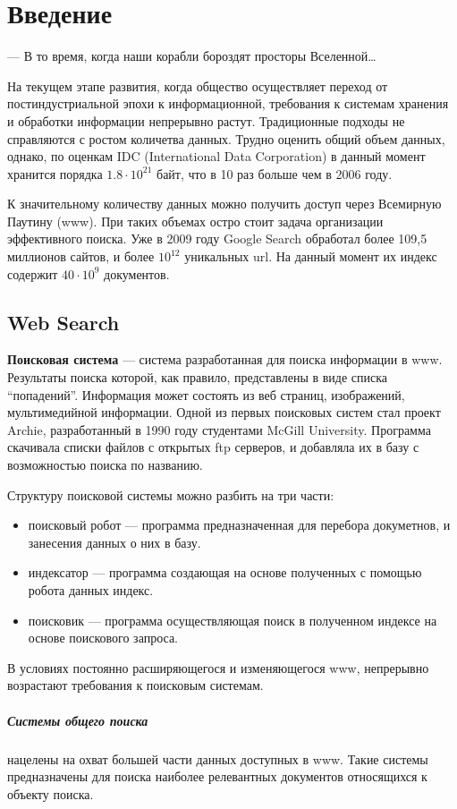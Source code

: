 \chapter{Введение} 
\epigraph{— В то время, когда наши корабли бороздят просторы
Вселенной…}{} На текущем этапе развития, когда общество осуществляет переход от
постиндустриальной эпохи к информационной, требования к системам хранения и
обработки информации непрерывно растут. Традиционные подходы не справляются с
ростом количетва данных. Трудно оценить общий объем данных, однако, по оценкам
IDC (International Data Corporation) в данный момент хранится порядка
$1.8\cdot10^{21}$ байт, что в 10 раз больше чем в 2006 году.

К значительному количеству данных можно получить доступ через Всемирную Паутину
(www). При таких объемах остро стоит задача организации эффективного поиска. Уже
в 2009 году Google Search обработал более 109,5 миллионов сайтов, и более
$10^{12}$ уникальных url. На данный момент их индекс содержит $40\cdot10^{9}$
документов.

\section{Web Search} 
\textbf{Поисковая система} --- система разработанная для
поиска информации в www. Результаты поиска которой, как правило, представлены в
виде списка ``попадений''. Информация может состоять из веб страниц,  изображений,
мультимедийной информации. Одной из первых поисковых систем стал
проект Archie, разработанный в 1990 году студентами McGill University. Программа скачивала
списки файлов с открытых ftp серверов, и добавляла их в базу с возможностью
поиска по названию. %

Структуру поисковой системы можно разбить на три части: \begin{itemize} \item
поисковый робот --- программа предназначенная для перебора докуметнов, и
занесения данных о них в базу. \item индексатор --- программа создающая на
основе полученных с помощью робота данных индекс. \item поисковик --- программа
осуществляющая поиск в полученном индексе на основе поискового запроса.
\end{itemize} В условиях постоянно расширяющегося и изменяющегося www, непрерывно
возрастают требования к поисковым системам. 

\paragraph{Системы общего поиска} нацелены на охват большей части данных
доступных в www. Такие системы предназначены для поиска наиболее релевантных
документов относящихся к объекту поиска. 
